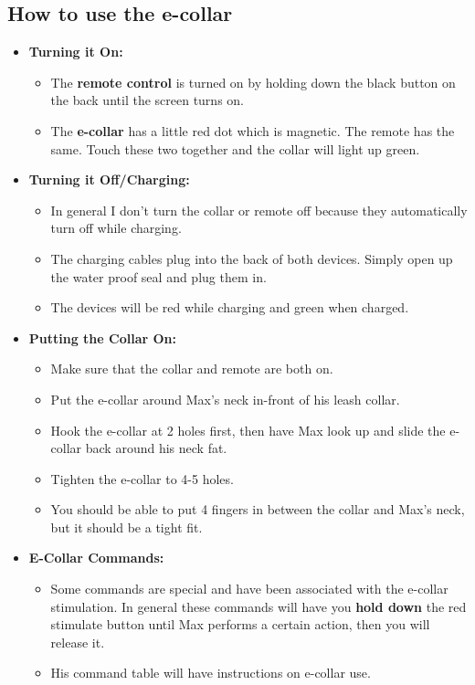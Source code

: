 \documentclass[pdftex,12pt]{article}
\begin{document}
\subsection{How to use the e-collar}
\begin{itemize}
    \item \textbf{Turning it On:}
        \begin{itemize}
            \item The \textbf{remote control} is turned on by holding
                down the black button on the back until the screen turns on.
            \item The \textbf{e-collar} has a little red dot which is magnetic. The
                remote has the same. Touch these two together and the collar
                will light up green.
        \end{itemize}
    \item \textbf{Turning it Off/Charging:}
        \begin{itemize}
            \item In general I don't turn the collar or remote off because
                they automatically turn off while charging.
            \item The charging cables plug into the back of both devices.
                Simply open up the water proof seal and plug them in.
            \item The devices will be red while charging and green when
                charged.
        \end{itemize}
    \item \textbf{Putting the Collar On:}
        \begin{itemize}
            \item Make sure that the collar and remote are both on.
            \item Put the e-collar around Max's neck in-front of his leash
                collar.
            \item Hook the e-collar at 2 holes first, then have Max look up
                and slide the e-collar back around his neck fat.
            \item Tighten the e-collar to 4-5 holes.
            \item You should be able to put 4 fingers in between the collar
                and Max's neck, but it should be a tight fit.
        \end{itemize}
    \item \textbf{E-Collar Commands:}
        \begin{itemize}
            \item Some commands are special and have been associated with the
                e-collar stimulation. In general these commands will have you
                \textbf{hold down} the red stimulate button until Max performs
                a certain action, then you will release it.
            \item His command table will have instructions on e-collar use.
        \end{itemize}
\end{itemize}
\end{document}

